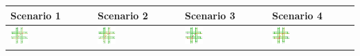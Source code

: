 \begin{table}[b]
	\centering
	\renewcommand{\arraystretch}{1.3}
	\begin{tabularx}{\textwidth}{|Y|Y|Y|Y|}
		\hline
		
		\textbf{Scenario} 1 & \textbf{Scenario 2} & \textbf{Scenario 3} & \textbf{Scenario 4} \\
		
		\hline
		
		\includegraphics[width=0.23\textwidth, trim=0 0 0 -3]{../gfx/data/E1_003.png} &
		\includegraphics[width=0.23\textwidth, trim=0 0 0 -3]{../gfx/data/E2_003.png} &
		\includegraphics[width=0.23\textwidth, trim=0 0 0 -3]{../gfx/data/E3_003.png} &
		\includegraphics[width=0.23\textwidth, trim=0 0 0 -3]{../gfx/data/E4_003.png} \\
		
		\hline
		

\end{tabularx}
\end{table}
